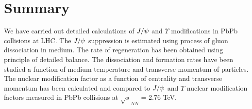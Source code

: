 \documentclass[aps,prc,preprint,superscriptaddress,showpacs,showkeys]{revtex4-1}
\begin{document}
\section{Summary}
 We have carried out detailed calculations of $J/\psi$ and $\Upsilon$ 
modifications in PbPb collisions at LHC.
  The $J/\psi$ suppression is estimated using process of gluon dissociation in medium. 
The rate of regeneration has been obtained using principle of detailed balance.
  The dissociation and formation rates have been studied a function of medium temperature
and transverse momentum of particles.
  The nuclear modification factor as a function of centrality and transverse momentum has been calculated  
and compared to $J/\psi$ and $\Upsilon$ nuclear modification factors measured in PbPb collisions 
at $\sqrt s_{NN}$ =  2.76 TeV.


\noindent
\end{document}
